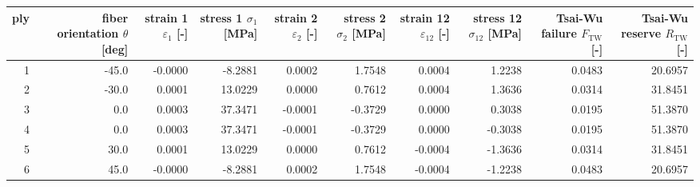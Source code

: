 \begin{tabular}{rrrrrrrrrr}
\toprule
ply & fiber orientation $\theta$ [deg] & strain 1 $\varepsilon_1$ [-] & stress 1 $\sigma_1$ [MPa] & strain 2 $\varepsilon_2$ [-] & stress 2 $\sigma_2$ [MPa] & strain 12 $\varepsilon_{12}$ [-] & stress 12 $\sigma_{12}$ [MPa] & Tsai-Wu failure $F_\mathrm{TW}$ [-] & Tsai-Wu reserve $R_\mathrm{TW}$ [-] \\
\midrule
  1 &                            -45.0 &                      -0.0000 &                   -8.2881 &                       0.0002 &                    1.7548 &                           0.0004 &                        1.2238 &                              0.0483 &                             20.6957 \\
  2 &                            -30.0 &                       0.0001 &                   13.0229 &                       0.0000 &                    0.7612 &                           0.0004 &                        1.3636 &                              0.0314 &                             31.8451 \\
  3 &                              0.0 &                       0.0003 &                   37.3471 &                      -0.0001 &                   -0.3729 &                           0.0000 &                        0.3038 &                              0.0195 &                             51.3870 \\
  4 &                              0.0 &                       0.0003 &                   37.3471 &                      -0.0001 &                   -0.3729 &                           0.0000 &                       -0.3038 &                              0.0195 &                             51.3870 \\
  5 &                             30.0 &                       0.0001 &                   13.0229 &                       0.0000 &                    0.7612 &                          -0.0004 &                       -1.3636 &                              0.0314 &                             31.8451 \\
  6 &                             45.0 &                      -0.0000 &                   -8.2881 &                       0.0002 &                    1.7548 &                          -0.0004 &                       -1.2238 &                              0.0483 &                             20.6957 \\
\bottomrule
\end{tabular}
